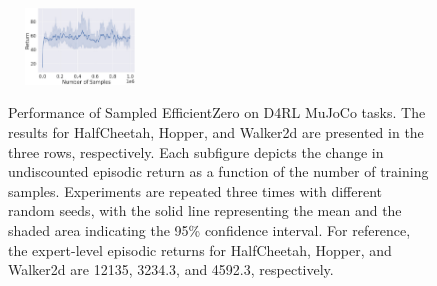 \begin{figure}[t]
{\includegraphics[width=1.5in, height=0.8in]{hp-rnd-mz.pdf}}
\caption{Performance of Sampled EfficientZero on D4RL MuJoCo tasks. The results for HalfCheetah, Hopper, and Walker2d are presented in the three rows, respectively. Each subfigure depicts the change in undiscounted episodic return as a function of the number of training samples. Experiments are repeated three times with different random seeds, with the solid line representing the mean and the shaded area indicating the 95\% confidence interval. For reference, the expert-level episodic returns for HalfCheetah, Hopper, and Walker2d are 12135, 3234.3, and 4592.3, respectively.}
\label{fig:1} 
\end{figure}


